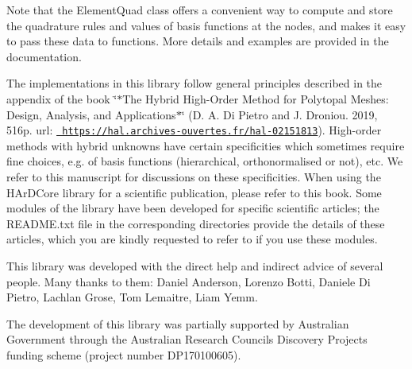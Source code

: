 Note that the {\ttfamily Element\+Quad} class offers a convenient way to compute and store the quadrature rules and values of basis functions at the nodes, and makes it easy to pass these data to functions. More details and examples are provided in the documentation.

The implementations in this library follow general principles described in the appendix of the book \char`\"{}$\ast$\+The Hybrid High-\/\+Order Method for Polytopal Meshes\+: Design, Analysis, and Applications$\ast$\char`\"{} (D. A. Di Pietro and J. Droniou. 2019, 516p. url\+: \href{https://hal.archives-ouvertes.fr/hal-02151813}{\texttt{ https\+://hal.\+archives-\/ouvertes.\+fr/hal-\/02151813}}). High-\/order methods with hybrid unknowns have certain specificities which sometimes require fine choices, e.\+g. of basis functions (hierarchical, orthonormalised or not), etc. We refer to this manuscript for discussions on these specificities. When using the H\+Ar\+D\+Core library for a scientific publication, please refer to this book. Some modules of the library have been developed for specific scientific articles; the R\+E\+A\+D\+M\+E.\+txt file in the corresponding directories provide the details of these articles, which you are kindly requested to refer to if you use these modules.

This library was developed with the direct help and indirect advice of several people. Many thanks to them\+: Daniel Anderson, Lorenzo Botti, Daniele Di Pietro, Lachlan Grose, Tom Lemaitre, Liam Yemm.

The development of this library was partially supported by Australian Government through the Australian Research Council\textquotesingle{}s Discovery Projects funding scheme (project number D\+P170100605). 